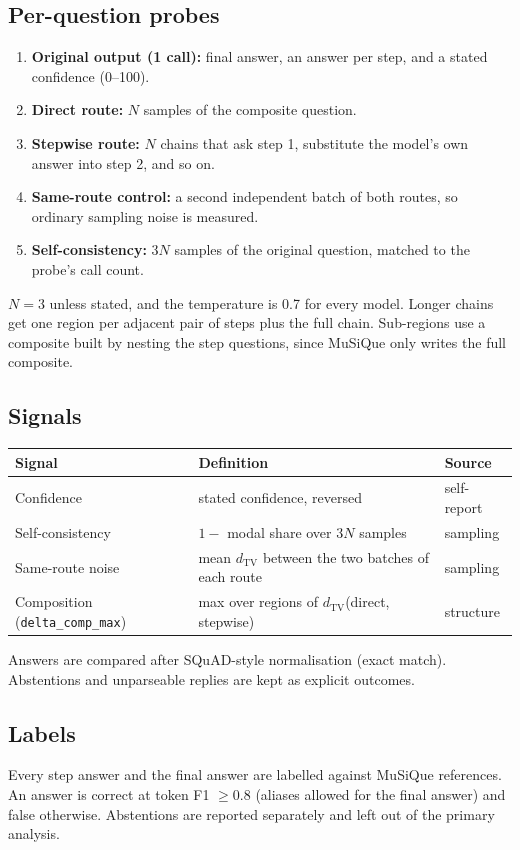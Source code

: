 \documentclass[11pt]{article}
\newcommand{\code}[1]{\texttt{#1}}
\begin{document}
\subsection{Per-question probes}
\begin{enumerate}
  \item \textbf{Original output (1 call):} final answer, an answer per step, and a stated
        confidence (0--100).
  \item \textbf{Direct route:} $N$ samples of the composite question.
  \item \textbf{Stepwise route:} $N$ chains that ask step 1, substitute the model's own
        answer into step 2, and so on.
  \item \textbf{Same-route control:} a second independent batch of both routes, so ordinary
        sampling noise is measured.
  \item \textbf{Self-consistency:} $3N$ samples of the original question, matched to the
        probe's call count.
\end{enumerate}
$N = 3$ unless stated, and the temperature is 0.7 for every model. Longer chains get one
region per adjacent pair of steps plus the full chain. Sub-regions use a composite built by
nesting the step questions, since MuSiQue only writes the full composite.

\subsection{Signals}
\begin{center}
\small
\begin{tabular}{lll}
\toprule
Signal & Definition & Source \\
\midrule
Confidence & stated confidence, reversed & self-report \\
Self-consistency & $1 -$ modal share over $3N$ samples & sampling \\
Same-route noise & mean $d_{\mathrm{TV}}$ between the two batches of each route & sampling \\
Composition (\code{delta\_comp\_max}) & max over regions of $d_{\mathrm{TV}}$(direct, stepwise) & structure \\
\bottomrule
\end{tabular}
\end{center}
Answers are compared after SQuAD-style normalisation (exact match). Abstentions and
unparseable replies are kept as explicit outcomes.

\subsection{Labels}
Every step answer and the final answer are labelled against MuSiQue references. An answer is
correct at token F1 $\geq 0.8$ (aliases allowed for the final answer) and false otherwise.
Abstentions are reported separately and left out of the primary analysis.
\end{document}
